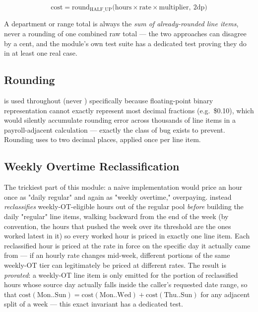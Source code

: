 \[
  \text{cost} = \text{round}_{\text{HALF\_UP}}\bigl(\text{hours} \times \text{rate} \times \text{multiplier},\ 2\text{dp}\bigr)
\]

A department or range total is always the \emph{sum of already-rounded
line items}, never a rounding of one combined raw total --- the two
approaches can disagree by a cent, and the module's own test suite has
a dedicated test proving they do in at least one real case.

\subsection*{Rounding}

 is used throughout (never ) specifically
because floating-point binary representation cannot exactly represent
most decimal fractions (e.g.\ \$0.10), which would silently accumulate
rounding error across thousands of line items in a payroll-adjacent
calculation --- exactly the class of bug 
exists to prevent. Rounding uses  to two decimal
places, applied once per line item.

\subsection*{Weekly Overtime Reclassification}

The trickiest part of this module: a naive implementation would price
an hour once as "daily regular" and again as "weekly overtime,"
overpaying.  instead
\emph{reclassifies} weekly-OT-eligible hours out of the regular pool
\emph{before} building the daily "regular" line items, walking backward
from the end of the week (by convention, the hours that pushed the week
over its threshold are the ones worked latest in it) so every worked
hour is priced in exactly one line item. Each reclassified hour is
priced at the rate in force on the specific day it actually came from
--- if an hourly rate changes mid-week, different portions of the same
weekly-OT tier can legitimately be priced at different rates. The
result is \emph{prorated}: a weekly-OT line item is only emitted for
the portion of reclassified hours whose source day actually falls
inside the caller's requested date range, so that
$\text{cost}(\text{Mon..Sun}) = \text{cost}(\text{Mon..Wed}) +
\text{cost}(\text{Thu..Sun})$ for any adjacent split of a week --- this
exact invariant has a dedicated test.

